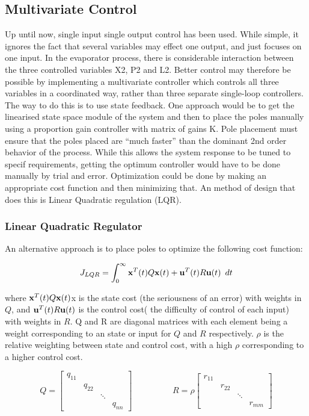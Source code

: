 \documentclass[11pt]{article}
\begin{document}
\subsection{Multivariate Control}
Up until now, single input single output control has been used. While simple, it ignores the fact that several variables may effect one output, and just focuses on one input. In the evaporator process, there is considerable interaction between the three controlled variables X2, P2 and L2. Better control may therefore be possible by implementing a multivariate controller which controls all three variables in a coordinated way, rather than three separate single-loop controllers. The way to do this is to use state feedback. One approach would be to get the linearised state space module of the system and then to place the poles manually using a proportion gain controller with matrix of gains K. Pole placement must ensure that the poles placed  are “much faster” than the dominant 2nd order behavior of the process. While this allows the system response to be tuned to specif requirements, getting the optimum controller would have to be done manually by trial and error. Optimization could be done by making an appropriate cost function and then minimizing that. An method of design that does this is Linear Quadratic regulation (LQR).

\subsubsection{Linear Quadratic Regulator}
An alternative approach is to place poles to optimize the following cost function:

\[J_{LQR} = \int_0^\infty \bold{x}^T(t)Q\bold{x}(t) + \bold{u}^T(t)R\bold{u}(t)\hspace{0.5em} dt\]

where $\bold{x}^T(t)Q\bold{x}(t)$x is the state cost (the seriousness of an error) with weights in $Q$, and $\bold{u}^T(t)R\bold{u}(t)$ is the control cost( the difficulty of control of each input)  with weights in $R$. Q and R are diagonal matrices with each element being a weight corresponding to an state or input for $Q$ and $R$ respectively. $\rho$ is the relative weighting between state  and control cost, with  a high $\rho$ corresponding to a higher control cost.

\[
Q = 
\begin{bmatrix}
	q_{11} &  		&  		& 		\\
           & q_{22} &  		& 		\\
           & 		&\ddots & 		\\
           & 		&  		& q_{nn}
\end{bmatrix}
\hspace{2cm}
R = \rho
\begin{bmatrix}
	r_{11} &  		&  		& 		\\
           & r_{22} &  		& 		\\
           & 		&\ddots & 		\\
           & 		&  		& r_{mm}
\end{bmatrix}
\]
\end{document}
